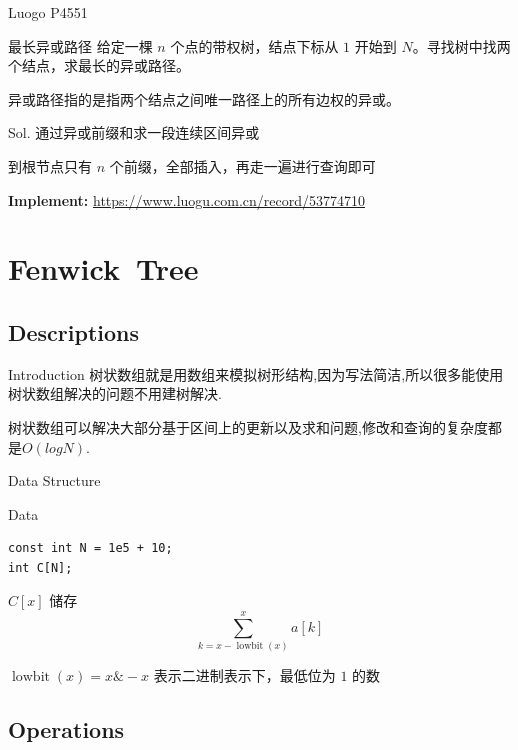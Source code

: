 \documentclass{beamer}
\begin{document}
\begin{frame}{Luogo P4551}
  \begin{block}{最长异或路径}
    给定一棵 $n$ 个点的带权树，结点下标从 $1$ 开始到 $N$。寻找树中找两个结点，求最长的异或路径。

异或路径指的是指两个结点之间唯一路径上的所有边权的异或。

  \end{block}

  \pause
  \begin{block}{Sol.}
    通过异或前缀和求一段连续区间异或

    到根节点只有 $n$ 个前缀，全部插入，再走一遍进行查询即可

  \textbf{Implement:} \url{https://www.luogu.com.cn/record/53774710}
  \end{block}
\end{frame}

\section{Fenwick\ Tree}

\subsection{Descriptions}

\begin{frame}{Introduction}
树状数组就是用数组来模拟树形结构,因为写法简洁,所以很多能使用树状数组解决的问题不用建树解决.

树状数组可以解决大部分基于区间上的更新以及求和问题,修改和查询的复杂度都是$O(logN)$.
\end{frame}


\begin{frame}[fragile]{Data Structure}
  \begin{block}{Data}
    \begin{lstlisting}
const int N = 1e5 + 10;
int C[N];
    \end{lstlisting}
  \end{block}
  $C[x]$ 储存 $$\displaystyle \sum_{k = x - \operatorname{lowbit}(x)}^x a[k]$$ 
  
  $\operatorname{lowbit}(x) = x \& -x$ 表示二进制表示下，最低位为 $1$ 的数
\end{frame}

\subsection{Operations}
\end{document}
